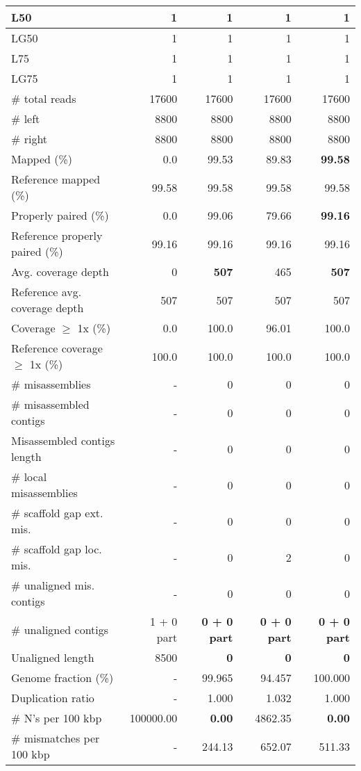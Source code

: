 \documentclass[12pt,a4paper]{article}
\begin{document}
\begin{table}[ht]
\begin{center}
\begin{tabular}{|l*{4}{|r}|}
L50 & 1 & 1 & 1 & 1 \\ \hline
LG50 & 1 & 1 & 1 & 1 \\ \hline
L75 & 1 & 1 & 1 & 1 \\ \hline
LG75 & 1 & 1 & 1 & 1 \\ \hline
\# total reads & 17600 & 17600 & 17600 & 17600 \\ \hline
\# left & 8800 & 8800 & 8800 & 8800 \\ \hline
\# right & 8800 & 8800 & 8800 & 8800 \\ \hline
Mapped (\%) & 0.0 & 99.53 & 89.83 & {\bf 99.58} \\ \hline
Reference mapped (\%) & 99.58 & 99.58 & 99.58 & 99.58 \\ \hline
Properly paired (\%) & 0.0 & 99.06 & 79.66 & {\bf 99.16} \\ \hline
Reference properly paired (\%) & 99.16 & 99.16 & 99.16 & 99.16 \\ \hline
Avg. coverage depth & 0 & {\bf 507} & 465 & {\bf 507} \\ \hline
Reference avg. coverage depth & 507 & 507 & 507 & 507 \\ \hline
Coverage $\geq$ 1x (\%) & 0.0 & 100.0 & 96.01 & 100.0 \\ \hline
Reference coverage $\geq$ 1x (\%) & 100.0 & 100.0 & 100.0 & 100.0 \\ \hline
\# misassemblies & - & 0 & 0 & 0 \\ \hline
\# misassembled contigs & - & 0 & 0 & 0 \\ \hline
Misassembled contigs length & - & 0 & 0 & 0 \\ \hline
\# local misassemblies & - & 0 & 0 & 0 \\ \hline
\# scaffold gap ext. mis. & - & 0 & 0 & 0 \\ \hline
\# scaffold gap loc. mis. & - & 0 & 2 & 0 \\ \hline
\# unaligned mis. contigs & - & 0 & 0 & 0 \\ \hline
\# unaligned contigs & 1 + 0 part & {\bf 0 + 0 part} & {\bf 0 + 0 part} & {\bf 0 + 0 part} \\ \hline
Unaligned length & 8500 & {\bf 0} & {\bf 0} & {\bf 0} \\ \hline
Genome fraction (\%) & - & 99.965 & 94.457 & 100.000 \\ \hline
Duplication ratio & - & 1.000 & 1.032 & 1.000 \\ \hline
\# N's per 100 kbp & 100000.00 & {\bf 0.00} & 4862.35 & {\bf 0.00} \\ \hline
\# mismatches per 100 kbp & - & 244.13 & 652.07 & 511.33 \\ \hline

\end{tabular}
\end{center}
\end{table}
\end{document}
